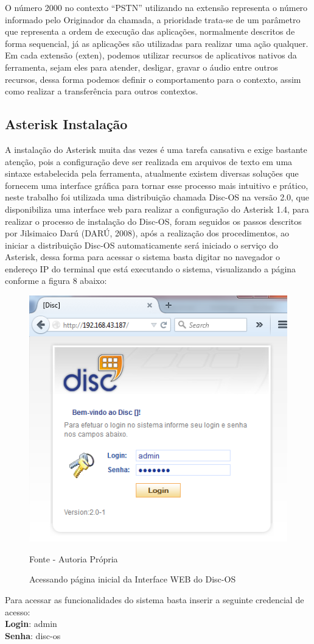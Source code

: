 O número 2000 no contexto “PSTN” utilizando na extensão representa o número informado pelo Originador da chamada, a prioridade trata-se de um parâmetro que representa a ordem de execução das aplicações, normalmente descritos de forma sequencial, já as aplicações são utilizadas para realizar uma ação qualquer. Em cada extensão (exten), podemos utilizar recursos de aplicativos nativos da ferramenta, sejam eles para atender, desligar, gravar o áudio entre outros recursos, dessa forma podemos definir o comportamento para o contexto, assim como realizar a transferência para outros contextos.


\subsection{Asterisk Instalação}

A instalação do Asterisk muita das vezes é uma tarefa cansativa e exige bastante atenção, pois a configuração deve ser realizada em arquivos de texto em uma sintaxe estabelecida pela ferramenta, atualmente existem diversas soluções que fornecem uma interface gráfica para tornar esse processo mais intuitivo e prático, neste trabalho foi utilizada uma distribuição chamada Disc-OS na versão 2.0, que disponibiliza uma interface web para realizar a configuração do Asterisk 1.4, para realizar o processo de instalação do Disc-OS, foram seguidos os passos descritos por Jilsimaico Darú (DARÚ, 2008), após a realização dos procedimentos, ao iniciar a distribuição Disc-OS automaticamente será iniciado o serviço do Asterisk, dessa forma para acessar o sistema basta digitar no navegador o endereço IP do terminal que está executando o sistema, visualizando a página conforme a figura 8 abaixo:


\begin{figure}[!htb]
	\centering
	\includegraphics{figuras/pagina_inicial_asterisk.png}
	\caption{Acessando página inicial da Interface WEB do Disc-OS}	
	Fonte - Autoria Própria
\end{figure}


Para acessar as funcionalidades do sistema basta inserir a seguinte credencial de acesso:\\
\textbf{Login}: admin\\
\textbf{Senha}: disc-os\\
